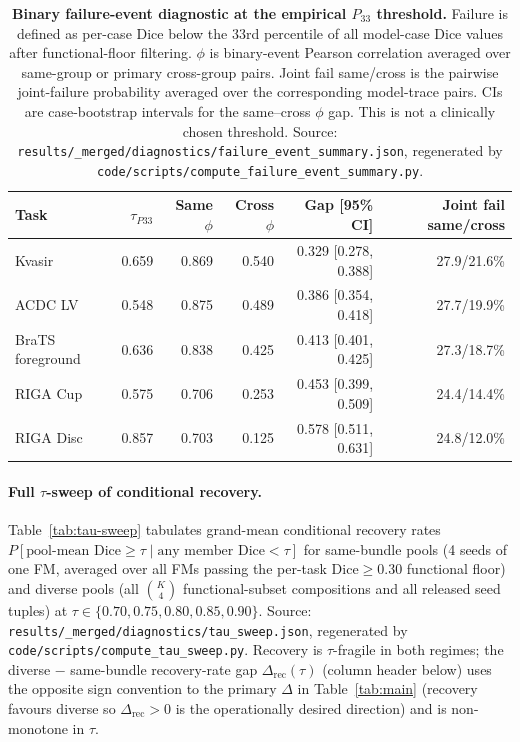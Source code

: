 \begin{table}[!htbp]
  \caption{\textbf{Binary failure-event diagnostic at the empirical
  $P_{33}$ threshold.} Failure is defined as per-case Dice below the 33rd
  percentile of all model-case Dice values after functional-floor filtering.
  $\phi$ is binary-event Pearson correlation averaged over same-group or
  primary cross-group pairs. Joint fail same/cross is the pairwise joint-failure
  probability averaged over the corresponding model-trace pairs. CIs are case-bootstrap intervals for the
  same--cross $\phi$ gap. This is not a clinically chosen threshold. Source:
  \texttt{results/\_merged/diagnostics/failure\_event\_summary.json},
  regenerated by \texttt{code/scripts/compute\_failure\_event\_summary.py}.}
  \label{tab:failure-event-summary}
  \centering\footnotesize
  \begin{tabular}{lrrrrr}
    \toprule
    Task & $\tau_{P33}$ & Same $\phi$ & Cross $\phi$ & Gap [95\% CI] & Joint fail same/cross \\
    \midrule
    Kvasir & 0.659 & 0.869 & 0.540 & 0.329 [0.278, 0.388] & 27.9/21.6\% \\
    ACDC LV & 0.548 & 0.875 & 0.489 & 0.386 [0.354, 0.418] & 27.7/19.9\% \\
    BraTS foreground & 0.636 & 0.838 & 0.425 & 0.413 [0.401, 0.425] & 27.3/18.7\% \\
    RIGA Cup & 0.575 & 0.706 & 0.253 & 0.453 [0.399, 0.509] & 24.4/14.4\% \\
    RIGA Disc & 0.857 & 0.703 & 0.125 & 0.578 [0.511, 0.631] & 24.8/12.0\% \\
    \bottomrule
  \end{tabular}
\end{table}

\paragraph{Full $\tau$-sweep of conditional recovery.} Table~\ref{tab:tau-sweep} tabulates grand-mean conditional recovery rates $P[\text{pool-mean Dice}\geq\tau\mid\text{any member Dice}<\tau]$ for same-bundle pools (4 seeds of one FM, averaged over all FMs passing the per-task $\text{Dice}\geq 0.30$ functional floor) and diverse pools (all $\binom{K}{4}$ functional-subset compositions and all released seed tuples) at $\tau\in\{0.70,0.75,0.80,0.85,0.90\}$. Source: \texttt{results/\_merged/diagnostics/tau\_sweep.json}, regenerated by \texttt{code/scripts/compute\_tau\_sweep.py}. Recovery is $\tau$-fragile in both regimes; the diverse $-$ same-bundle recovery-rate gap $\Delta_{\mathrm{rec}}(\tau)$ (column header below) uses the opposite sign convention to the primary $\Delta$ in Table~\ref{tab:main} (recovery favours diverse so $\Delta_{\mathrm{rec}}{>}0$ is the operationally desired direction) and is non-monotone in $\tau$.

